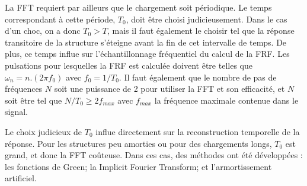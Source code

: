 La FFT requiert par ailleurs que le chargement soit périodique. 
Le temps correspondant à cette période, $T_0$, doit être choisi judicieusement.
Dans le cas d'un choc, on a donc $T_0 > T$, mais il faut également le choisir
tel que la réponse transitoire de la structure s'éteigne avant la fin de cet
intervalle de temps.
De plus, ce temps influe sur l'échantillonnage fréquentiel du calcul de la FRF.
Les pulsations pour lesquelles la FRF est calculée doivent être telles que
$\omega_n=n.(2\pi f_0)$ avec $f_0=1/T_0$.
Il faut également que le nombre de pas de fréquences $N$ soit une puissance de 2
pour utiliser la FFT et son efficacité, et $N$ soit être tel que
$N/T_0 \ge 2 f_{max}$ avec $f_{max}$ la fréquence maximale contenue dans
le signal.

\medskip
Le choix judicieux de $T_0$ influe directement sur la reconstruction temporelle
de la réponse.
Pour les structures peu amorties ou pour des chargements longs, $T_0$ est grand, et
donc la FFT coûteuse.
Dans ces cas, des méthodes ont été développées : les fonctions de Green;
la Implicit Fourier Transform; et l'armortissement artificiel.
